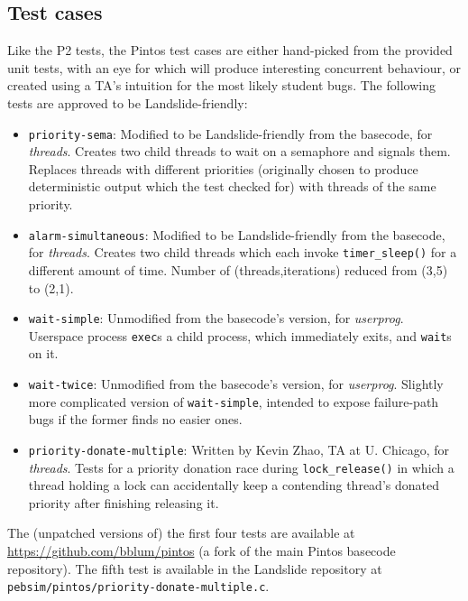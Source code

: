 \subsection{Test cases}
\label{sec:education-pintos-tests}

Like the P2 tests, the Pintos test cases are either hand-picked from the provided unit tests,
with an eye for which will produce interesting concurrent behaviour,
or created using a TA's intuition for the most likely student bugs.
The following tests are approved to be Landslide-friendly:

\begin{itemize}
	\item {\tt priority-sema}:
		Modified to be Landslide-friendly from the basecode, for {\em threads}.
		Creates two child threads to wait on a semaphore and signals them.
		Replaces threads with different priorities
		(originally chosen to produce deterministic output which the test checked for)
		with threads of the same priority.
	\item {\tt alarm-simultaneous}:
		Modified to be Landslide-friendly from the basecode, for {\em threads}.
		Creates two child threads which each invoke {\tt timer\_sleep()} for a different amount of time.
		Number of (threads,iterations) reduced from (3,5) to (2,1).
	\item {\tt wait-simple}:
		Unmodified from the basecode's version, for {\em userprog}.
		Userspace process {\tt exec}s a child process, which immediately exits, and {\tt wait}s on it.
	\item {\tt wait-twice}:
		Unmodified from the basecode's version, for {\em userprog}.
		Slightly more complicated version of {\tt wait-simple},
		intended to expose failure-path bugs if the former finds no easier ones.
	\item {\tt priority-donate-multiple}:
		Written by Kevin Zhao, TA at U. Chicago, for {\em threads}.
		Tests for a priority donation race during {\tt lock\_release()}
		in which a thread holding a lock can accidentally keep a contending thread's donated priority
		after finishing releasing it.
\end{itemize}
\vspace{1em}

The (unpatched versions of) the first four tests are available at
\url{https://github.com/bblum/pintos} (a fork of the main Pintos basecode repository).
The fifth test is available in the Landslide repository at {\tt pebsim/pintos/priority-donate-multiple.c}.

